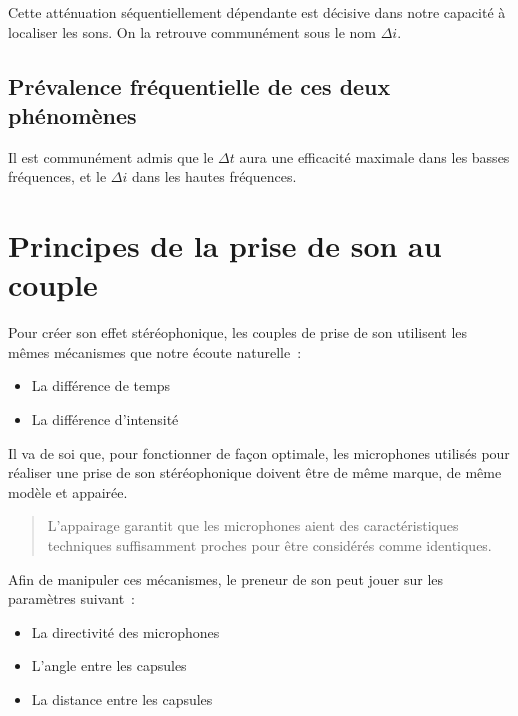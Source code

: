 \documentclass[
  letterpaper,
  DIV=11,
  numbers=noendperiod]{scrreprt}
\providecommand{\tightlist}{%
  \setlength{\itemsep}{0pt}\setlength{\parskip}{0pt}}\usepackage{longtable,booktabs,array}
\begin{document}
Cette atténuation séquentiellement dépendante est décisive dans notre
capacité à localiser les sons. On la retrouve communément sous le nom
\(\Delta i\).

\hypertarget{pruxe9valence-fruxe9quentielle-de-ces-deux-phuxe9nomuxe8nes}{%
\subsection{Prévalence fréquentielle de ces deux
phénomènes}\label{pruxe9valence-fruxe9quentielle-de-ces-deux-phuxe9nomuxe8nes}}

Il est communément admis que le \(\Delta t\) aura une efficacité
maximale dans les basses fréquences, et le \(\Delta i\) dans les hautes
fréquences.

\hypertarget{principes-de-la-prise-de-son-au-couple}{%
\section{Principes de la prise de son au
couple}\label{principes-de-la-prise-de-son-au-couple}}

Pour créer son effet stéréophonique, les couples de prise de son
utilisent les mêmes mécanismes que notre écoute naturelle~:

\begin{itemize}
\tightlist
\item
  La différence de temps
\item
  La différence d'intensité
\end{itemize}

Il va de soi que, pour fonctionner de façon optimale, les microphones
utilisés pour réaliser une prise de son stéréophonique doivent être de
même marque, de même modèle et appairée.

\begin{quote}
L'appairage garantit que les microphones aient des caractéristiques
techniques suffisamment proches pour être considérés comme identiques.
\end{quote}

Afin de manipuler ces mécanismes, le preneur de son peut jouer sur les
paramètres suivant~:

\begin{itemize}
\tightlist
\item
  La directivité des microphones
\item
  L'angle entre les capsules
\item
  La distance entre les capsules
\end{itemize}
\end{document}
